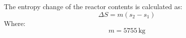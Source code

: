 The entropy change of the reactor contents is calculated as:  
\[
\Delta S = m(s_2 - s_1)
\]  
Where:  
\[
m = 5755 \, \text{kg}
\]